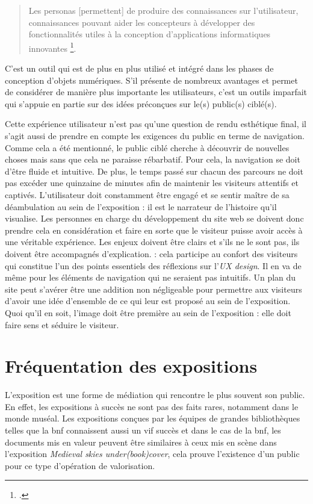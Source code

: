     \begin{quote}
	    Les personas [permettent] de produire des connaissances sur l’utilisateur, connaissances pouvant aider les concepteurs à développer des fonctionnalités utiles à la conception d’applications informatiques innovantes \footnote{\cite{brangierEffetsPersonasContraintes2012}.}. 
    \end{quote} 

    C’est un outil qui est de plus en plus utilisé et intégré dans les phases de conception d’objets numériques. S’il présente de nombreux avantages et permet de considérer de manière plus importante les utilisateurs, c’est un outils imparfait qui s’appuie en partie sur des idées préconçues sur le(s) public(s) ciblé(s). 


    Cette expérience utilisateur n’est pas qu’une question de rendu esthétique final, il s’agit aussi de prendre en compte les exigences du public en terme de navigation. Comme cela a été mentionné, le public ciblé cherche à découvrir de nouvelles choses mais sans que cela ne paraisse rébarbatif. Pour cela, la navigation se doit d’être fluide et intuitive. De plus, le temps passé sur chacun des parcours ne doit pas excéder une quinzaine de minutes afin de maintenir les visiteurs attentifs et captivés. L’utilisateur doit constamment être engagé et se sentir maître de sa déambulation au sein de l’exposition : il est le narrateur de l’histoire qu’il visualise. Les personnes en charge du développement du site web se doivent donc prendre cela en considération et faire en sorte que le visiteur puisse avoir accès à une véritable expérience. Les enjeux doivent être clairs et s’ils ne le sont pas, ils doivent être accompagnés d’explication. : cela participe au confort des visiteurs qui constitue l’un des points essentiels des réflexions sur l’\textit{UX design}. Il en va de même pour les éléments de navigation qui ne seraient pas intuitifs. Un plan du site peut s’avérer être une addition non négligeable pour permettre aux visiteurs d’avoir une idée d’ensemble de ce qui leur est proposé au sein de l’exposition. Quoi qu’il en soit, l’image doit être première au sein de l’exposition : elle doit faire sens et séduire le visiteur.

    \section{Fréquentation des expositions}
    L’exposition est une forme de médiation qui rencontre le plus souvent son public. En effet, les expositions à succès ne sont pas des faits rares, notamment dans le monde muséal. Les expositions conçues par les équipes de grandes bibliothèques telles que la \acrshort{bnf} connaissent aussi un vif succès et dans le cas de la \acrshort{bnf}, les documents mis en valeur peuvent être similaires à ceux mis en scène dans l’exposition \textit{Medieval skies under(book)cover}, cela prouve l’existence d’un public pour ce type d’opération de valorisation. 

